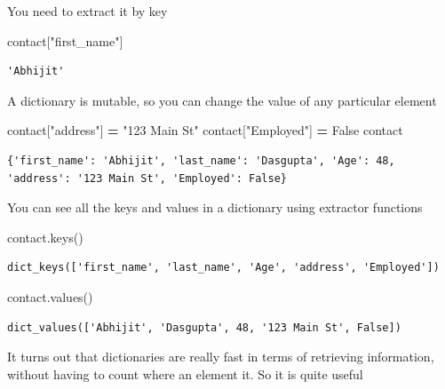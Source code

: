 \documentclass[
  letterpaper,
]{scrbook}
\newenvironment{Shaded}{\begin{snugshade}}{\end{snugshade}}
\newcommand{\NormalTok}[1]{#1}
\newcommand{\OperatorTok}[1]{\textcolor[rgb]{0.81,0.36,0.00}{\textbf{#1}}}
\newcommand{\StringTok}[1]{\textcolor[rgb]{0.31,0.60,0.02}{#1}}
\newcommand{\VariableTok}[1]{\textcolor[rgb]{0.00,0.00,0.00}{#1}}
\begin{document}
You need to extract it by key

\begin{Shaded}
\begin{Highlighting}[]
\NormalTok{contact[}\StringTok{"first_name"}\NormalTok{]}
\end{Highlighting}
\end{Shaded}

\begin{verbatim}
'Abhijit'
\end{verbatim}

A dictionary is mutable, so you can change the value of any particular element

\begin{Shaded}
\begin{Highlighting}[]
\NormalTok{contact[}\StringTok{"address"}\NormalTok{] }\OperatorTok{=} \StringTok{"123 Main St"}
\NormalTok{contact[}\StringTok{"Employed"}\NormalTok{] }\OperatorTok{=} \VariableTok{False}
\NormalTok{contact}
\end{Highlighting}
\end{Shaded}

\begin{verbatim}
{'first_name': 'Abhijit', 'last_name': 'Dasgupta', 'Age': 48, 'address': '123 Main St', 'Employed': False}
\end{verbatim}

You can see all the keys and values in a dictionary using extractor functions

\begin{Shaded}
\begin{Highlighting}[]
\NormalTok{contact.keys()}
\end{Highlighting}
\end{Shaded}

\begin{verbatim}
dict_keys(['first_name', 'last_name', 'Age', 'address', 'Employed'])
\end{verbatim}

\begin{Shaded}
\begin{Highlighting}[]
\NormalTok{contact.values()}
\end{Highlighting}
\end{Shaded}

\begin{verbatim}
dict_values(['Abhijit', 'Dasgupta', 48, '123 Main St', False])
\end{verbatim}

It turns out that dictionaries are really fast in terms of retrieving information, without having to count where an element it. So it is quite useful
\end{document}
